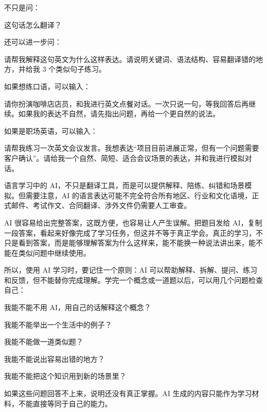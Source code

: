 不只是问：

\begin{tcolorbox}[promptbox]
这句话怎么翻译？
\end{tcolorbox}

还可以进一步问：

\begin{tcolorbox}[promptbox]
请帮我解释这句英文为什么这样表达。请说明关键词、语法结构、容易翻译错的地方，并给我 3 个类似句子练习。
\end{tcolorbox}

如果想练口语，可以输入：

\begin{tcolorbox}[promptbox]
请你扮演咖啡店店员，和我进行英文点餐对话。一次只说一句，等我回答后再继续。如果我的表达不自然，请先指出问题，再给一个更自然的说法。
\end{tcolorbox}

如果是职场英语，可以输入：

\begin{tcolorbox}[promptbox]
请帮我练习一次英文会议发言。我想表达“项目目前进展正常，但有一个问题需要客户确认”。请给我一个自然、简短、适合会议场景的表达，并和我进行模拟对话。
\end{tcolorbox}

语言学习中的 AI，不只是翻译工具，而是可以提供解释、陪练、纠错和场景模拟。但需要注意，AI 的语言表达可能不完全符合所有地区、行业和文化语境，正式邮件、考试作文、合同翻译、涉外文件仍需要人工审查。


AI 很容易给出完整答案，这既方便，也容易让人产生误解。把题目发给 AI，复制一段答案，看起来好像完成了学习任务，但这并不等于真正学会。真正的学习，不只是看到答案，而是能够理解答案为什么这样来，能不能换一种说法讲出来，能不能在类似问题中继续使用。

所以，使用 AI 学习时，要记住一个原则：AI 可以帮助解释、拆解、提问、练习和反馈，但不能替你完成理解。学完一个概念或一道题以后，可以用几个问题检查自己：

\begin{tcolorbox}[promptbox]
我能不能不用 AI，用自己的话解释这个概念？

我能不能举出一个生活中的例子？

我能不能做一道类似题？

我能不能说出容易出错的地方？

我能不能把这个知识用到新的场景里？
\end{tcolorbox}

如果这些问题回答不上来，说明还没有真正掌握。AI 生成的内容只能作为学习材料，不能直接等同于自己的能力。

